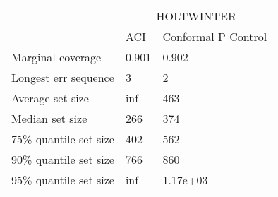 \begin{tabular}{lll}
\toprule
& \multicolumn{2}{c}{HOLTWINTER} \\
& ACI & Conformal P Control \\
\midrule
Marginal coverage & 0.901 & 0.902 \\
Longest err sequence & 3 & 2 \\
Average set size & inf & 463 \\
Median set size & 266 & 374 \\
75\% quantile set size & 402 & 562 \\
90\% quantile set size & 766 & 860 \\
95\% quantile set size & inf & 1.17e+03 \\
\bottomrule
\end{tabular}
